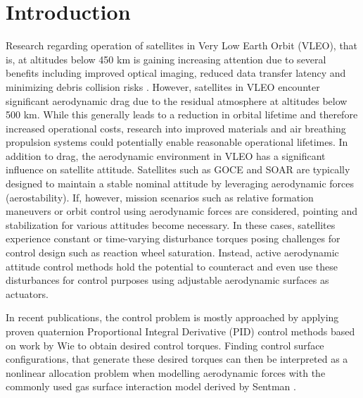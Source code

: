 \documentclass[pdflatex,sn-mathphys-num]{sn-jnl}%
\theoremstyle{thmstyleone}%
\theoremstyle{thmstyletwo}%
\theoremstyle{thmstylethree}%
\begin{document}



\maketitle

\section{Introduction}\label{sec:introduction}

    Research regarding operation of satellites in Very Low Earth Orbit (VLEO), that is, at altitudes below 450 km is gaining increasing attention due to several benefits including improved optical imaging, reduced data transfer latency and minimizing debris collision risks \cite{crispBenefitsVeryLow2020}. However, satellites in VLEO encounter significant aerodynamic drag due to the residual atmosphere at altitudes below 500 km. While this generally leads to a reduction in orbital lifetime and therefore increased operational costs, research into improved materials \cite{crispMethodExperimentalCharacterisation2022} and air breathing propulsion systems \cite{andreussiReviewAirbreathingElectric2022,schonherrAnalysisAtmosphereBreathingElectric2015} could potentially enable reasonable operational lifetimes. In addition to drag, the aerodynamic environment in VLEO has a significant influence on satellite attitude. Satellites such as GOCE \cite{drinkwaterGOCEESAsFirst2003} and SOAR \cite{crispSOARSatelliteOrbital} are typically designed to maintain a stable nominal attitude by leveraging aerodynamic forces (aerostability). If, however, mission scenarios such as relative formation maneuvers \cite{sabatiniAerodynamicCoordinatedControl2024} or orbit control using aerodynamic forces \cite{llopDescendingSunSynchronousOrbits2014} are considered, pointing and stabilization for various attitudes become necessary. In these cases, satellites experience constant or time-varying  disturbance torques posing challenges for control design such as reaction wheel saturation. Instead, active aerodynamic attitude control methods hold the potential to counteract and even use these disturbances for control purposes using adjustable aerodynamic surfaces as actuators. 
	
	In recent publications, the control problem is mostly approached by applying proven quaternion Proportional Integral Derivative (PID) control methods based on work by Wie \cite{wieQuaternionFeedbackRegulator1989} to obtain desired control torques. Finding control surface configurations, that generate these desired torques can then be interpreted as a nonlinear allocation problem when modelling aerodynamic forces with the commonly used gas surface interaction model derived by Sentman \cite{sentman_free_1961}.
\end{document}
